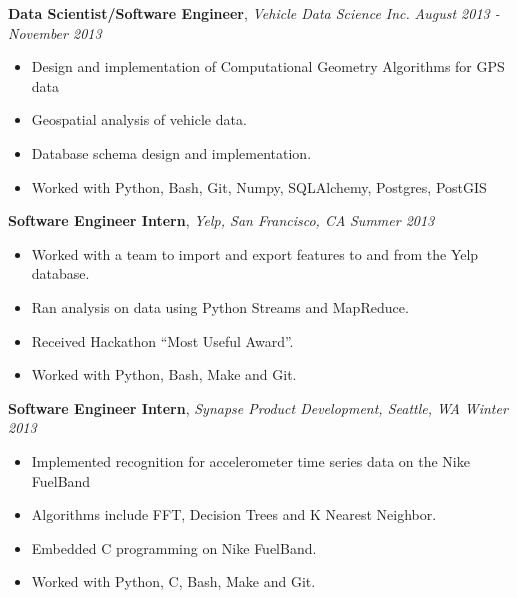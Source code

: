 \documentclass[9pt]{article}
\newenvironment{changemargin}[2]{%
  \begin{list}{}{%
    \setlength{\topsep}{0pt}%
    \setlength{\leftmargin}{#1}%
    \setlength{\rightmargin}{#2}%
    \setlength{\listparindent}{\parindent}%
    \setlength{\itemindent}{\parindent}%
    \setlength{\parsep}{\parskip}%
  }%
  \item[]}{\end{list}
}
\newenvironment{body} {
    \vspace*{-16pt}
    \begin{changemargin}{-0.20in}{-0.5in}
  }
    {\end{changemargin}
}
\begin{document}
\begin{body}
    \vspace{14pt}

    \textbf{Data Scientist/Software Engineer}, \emph{Vehicle Data Science Inc.} \hfill \emph{August 2013 - November 2013}\\
    \vspace*{-4pt}
    \begin{itemize} \itemsep -0pt  %
        \item Design and implementation of Computational Geometry Algorithms for GPS data
        \item Geospatial analysis of vehicle data.
        \item Database schema design and implementation.
        \item Worked with Python, Bash, Git, Numpy, SQLAlchemy, Postgres, PostGIS
    \end{itemize}

    \textbf{Software Engineer Intern}, \emph{Yelp, San Francisco, CA} \hfill \emph{Summer 2013}\\
    \vspace*{-4pt}
    \begin{itemize} \itemsep -0pt  %
        \item Worked with a team to import and export features to and from the Yelp database.
        \item Ran analysis on data using Python Streams and MapReduce.
        \item Received Hackathon “Most Useful Award”.
        \item Worked with Python, Bash, Make and Git.
    \end{itemize}

    \textbf{Software Engineer Intern}, \emph{Synapse Product Development, Seattle, WA} \hfill \emph{Winter 2013}\\
    \vspace*{-4pt}
    \begin{itemize} \itemsep -0pt  %
        \item Implemented recognition for accelerometer time series data on the Nike FuelBand
        \item Algorithms include FFT, Decision Trees and K Nearest Neighbor.
        \item Embedded C programming on Nike FuelBand.
        \item Worked with Python, C, Bash, Make and Git.
    \end{itemize}


\end{body}
\end{document}
